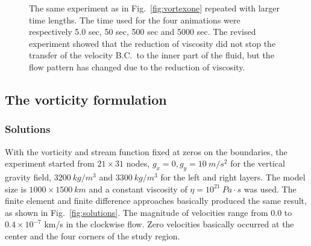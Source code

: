 \documentclass[12pt]{article}
\numberwithin{figure}{section}  %
\numberwithin{equation}{section}  %
\begin{document}
\begin{multicols}{2}
\begin{figure}[!htb]
{	}
	\caption{The same experiment as in Fig.\ \ref{fig:vortexone} repeated with larger time lengths. The time used for the four animations were respectively 5.0 sec, 50 sec, 500 sec and 5000 sec. The revised experiment showed that the reduction of viscosity did not stop the transfer of the velocity B.C.\ to the inner part of the fluid, but the flow pattern has changed due to the reduction of viscosity.}
	\label{fig:vortextwo}
\end{figure}

\subsection{The vorticity formulation}

\subsubsection{Solutions}

With the vorticity and stream function fixed at zeros on the boundaries, the experiment started from $21\times31$ nodes, $g_x=0,g_y=10\ m/s^2$ for the vertical gravity field, $3200\ kg/m^3$ and $3300\ kg/m^3$ for the left and right layers. The model size is $1000\times1500\ km$ and a constant viscosity of $\eta=10^{21}\ Pa\cdot{s}$ was used. The finite element and finite difference approaches basically produced the same result, as shown in Fig.\ \ref{fig:solutions}. The magnitude of velocities range from $0.0$ to $0.4\times10^{-7}$ km/s in the clockwise flow. Zero velocities basically occurred at the center and the four corners of the study region.


\end{multicols}
\end{document}
